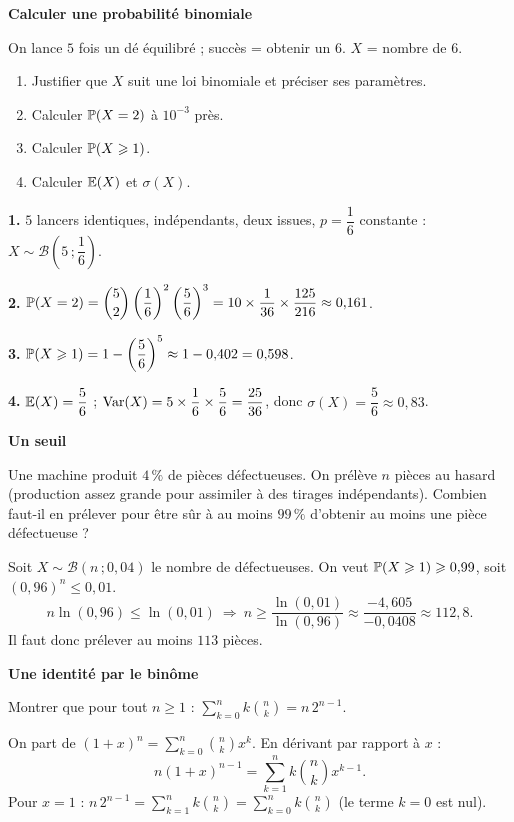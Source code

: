 \exerciceresolu
\textbf{Calculer une probabilité binomiale}

On lance $5$ fois un dé équilibré ; succès = obtenir un $6$. $X$ = nombre
de $6$.
\begin{enumerate}
	\item Justifier que $X$ suit une loi binomiale et préciser ses paramètres.
	\item Calculer $\mathbb{P}(X=2)$ à $10^{-3}$ près.
	\item Calculer $\mathbb{P}(X\geqslant1)$.
	\item Calculer $\mathbb{E}(X)$ et $\sigma(X)$.
\end{enumerate}

\solution

\textbf{1.} $5$ lancers identiques, indépendants, deux issues, $p=\dfrac16$
constante : $X\sim\mathscr{B}\!\left(5\,;\dfrac16\right)$.

\textbf{2.} $\mathbb{P}(X=2) = \dbinom{5}{2}\left(\dfrac16\right)^2
\left(\dfrac56\right)^3 = 10\times\dfrac{1}{36}\times\dfrac{125}{216}
\approx 0{,}161$.

\textbf{3.} $\mathbb{P}(X\geqslant1) = 1-\left(\dfrac56\right)^5
\approx 1-0{,}402 = 0{,}598$.

\textbf{4.} $\mathbb{E}(X) = \dfrac56$ ;
$\mathrm{Var}(X)=5\times\dfrac16\times\dfrac56=\dfrac{25}{36}$, donc
$\sigma(X)=\dfrac56\approx0{,}83$.

\exerciceresolu
\textbf{Un seuil}

Une machine produit $4\,\%$ de pièces défectueuses. On prélève $n$ pièces au
hasard (production assez grande pour assimiler à des tirages indépendants).
Combien faut-il en prélever pour être sûr à au moins $99\,\%$ d'obtenir au
moins une pièce défectueuse ?

\solution

Soit $X\sim\mathscr{B}(n\,;0{,}04)$ le nombre de défectueuses. On veut
$\mathbb{P}(X\geqslant 1)\geqslant 0{,}99$, soit $(0{,}96)^n\leqslant 0{,}01$.
\[
n\ln(0{,}96)\leqslant\ln(0{,}01)
\ \Longrightarrow\
n\geqslant\frac{\ln(0{,}01)}{\ln(0{,}96)}\approx\frac{-4{,}605}{-0{,}0408}
\approx 112{,}8.
\]
Il faut donc prélever au moins $\boxed{113}$ pièces.

\exerciceresolu
\textbf{Une identité par le binôme}

Montrer que pour tout $n\geqslant 1$ :
$\displaystyle\sum_{k=0}^{n} k\binom{n}{k} = n\,2^{n-1}$.

\solution

On part de $(1+x)^n = \displaystyle\sum_{k=0}^{n}\binom{n}{k}x^k$. En dérivant
par rapport à $x$ :
\[
n(1+x)^{n-1} = \sum_{k=1}^{n} k\binom{n}{k}x^{k-1}.
\]
Pour $x=1$ : $n\,2^{n-1} = \displaystyle\sum_{k=1}^{n} k\binom{n}{k}
= \sum_{k=0}^{n} k\binom{n}{k}$ (le terme $k=0$ est nul).


